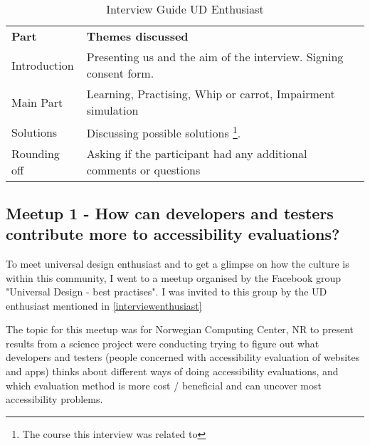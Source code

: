 \begin{savenotes}
    \begin{table}[ht]
        \centering
        \caption{Interview Guide UD Enthusiast}
        \label{ud-enthusiast-guide}
        \begin{minipage*}{\linewidth}
        \begin{tabular}{ p{5.5cm} p{8cm}}
        \hline
        \rowcolor{gray!50!} \textbf{Part} & \textbf{Themes discussed}\\
        Introduction & Presenting us and the aim of the interview. Signing consent form.  \\
        Main Part & Learning, Practising, Whip or carrot, Impairment simulation \\
        Solutions & Discussing possible solutions \footnote{The course this interview was related to }.  \\
        Rounding off & Asking if the participant had any additional comments or questions \\
        \end{tabular}
        \end{minipage*}
    \end{table}
\end{savenotes}



\subsection{Meetup 1 - How can developers and testers contribute more to accessibility evaluations?}
To meet universal design enthusiast and to get a glimpse on how the culture is within this community, I went to a meetup organised by the Facebook group "Universal Design - best practises". I was invited to this group by the UD enthusiast mentioned in \ref{interviewenthusiast}

The topic for this meetup was for Norwegian Computing Center, NR to present results from a science project were conducting trying to figure out what developers and testers (people concerned with accessibility evaluation of websites and apps) thinks about different ways of doing accessibility evaluations, and which evaluation method is more cost / beneficial and can uncover most accessibility problems.

